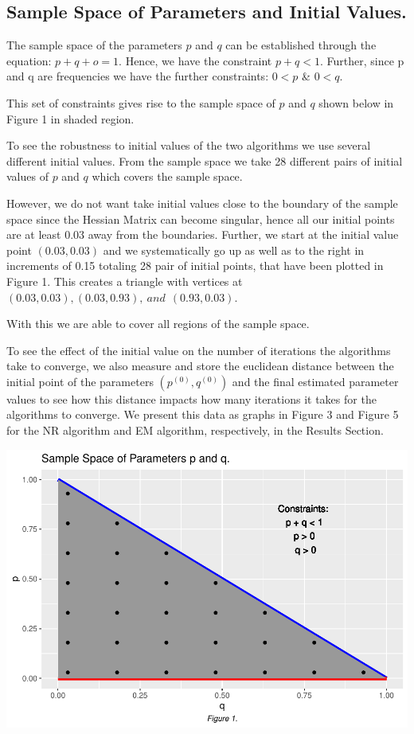\documentclass[]{article}
\begin{document}
\subsection{Sample Space of Parameters and Initial
Values.}\label{sample-space-of-parameters-and-initial-values.}

The sample space of the parameters \(p\) and \(q\) can be established
through the equation: \(p + q + o = 1\). Hence, we have the constraint
\(p + q < 1\). Further, since p and q are frequencies we have the
further constraints: \(0 < p\) \& \(0 < q\).

This set of constraints gives rise to the sample space of \(p\) and
\(q\) shown below in Figure 1 in shaded region.

To see the robustness to initial values of the two algorithms we use
several different initial values. From the sample space we take 28
different pairs of initial values of \(p\) and \(q\) which covers the
sample space.

However, we do not want take initial values close to the boundary of the
sample space since the Hessian Matrix can become singular, hence all our
initial points are at least 0.03 away from the boundaries. Further, we
start at the initial value point \((0.03, 0.03)\) and we systematically
go up as well as to the right in increments of 0.15 totaling 28 pair of
initial points, that have been plotted in Figure 1. This creates a
triangle with vertices at
\((0.03, 0.03), (0.03, 0.93), \: and \: \: (0.93, 0.03)\).

With this we are able to cover all regions of the sample space.

To see the effect of the initial value on the number of iterations the
algorithms take to converge, we also measure and store the euclidean
distance between the initial point of the parameters
\((p^{(0)}, q^{(0)})\) and the final estimated parameter values to see
how this distance impacts how many iterations it takes for the
algorithms to converge. We present this data as graphs in Figure 3 and
Figure 5 for the NR algorithm and EM algorithm, respectively, in the
Results Section.

\includegraphics{Rmarkdown_Faizan_HW1_CHL5224_Statistical_Genetics_files/figure-latex/unnamed-chunk-1-1.pdf}
\end{document}
